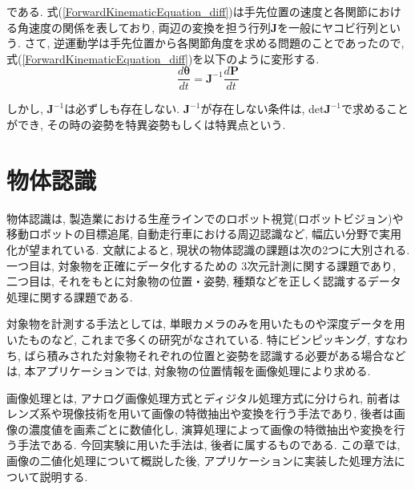 \documentclass{suribt}
\begin{document}
である. 式(\ref{ForwardKinematicEquation_diff})は手先位置の速度と各関節における角速度の関係を表しており, 両辺の変換を担う行列${\bm J}$を一般にヤコビ行列という. 
さて, 逆運動学は手先位置から各関節角度を求める問題のことであったので, 式(\ref{ForwardKinematicEquation_diff})を以下のように変形する.
\begin{equation}
	\label{ForwardKinematicEquation_diff}
	\frac{d{\bm \theta}}{dt} = {\bm J}^{-1}\frac{d{\bm P}}{dt}
\end{equation}

しかし, ${\bm J^{-1}}$は必ずしも存在しない. ${\bm J^{-1}}$が存在しない条件は, det${\bm J^{-1}}$で求めることができ, その時の姿勢を特異姿勢もしくは特異点という. 

\chapter{物体認識}
物体認識は, 製造業における生産ラインでのロボット視覚(ロボットビジョン)や移動ロボットの目標追尾, 自動走行車における周辺認識など, 幅広い分野で実用化が望まれている. 文献{}によると, 現状の物体認識の課題は次の2つに大別される. 一つ目は, 対象物を正確にデータ化するための 3次元計測に関する課題であり, 二つ目は, それをもとに対象物の位置・姿勢, 種類などを正しく認識するデータ処理に関する課題である. 

対象物を計測する手法としては, 単眼カメラのみを用いたものや深度データを用いたものなど, これまで多くの研究がなされている. 特にビンピッキング, すなわち, ばら積みされた対象物それぞれの位置と姿勢を認識する必要がある場合などは, 
本アプリケーションでは, 対象物の位置情報を画像処理により求める. 

画像処理とは, アナログ画像処理方式とディジタル処理方式に分けられ, 前者はレンズ系や現像技術を用いて画像の特徴抽出や変換を行う手法であり, 後者は画像の濃度値を画素ごとに数値化し, 演算処理によって画像の特徴抽出や変換を行う手法である. 今回実験に用いた手法は, 後者に属するものである. この章では, 画像の二値化処理について概説した後, アプリケーションに実装した処理方法について説明する.
\end{document}
